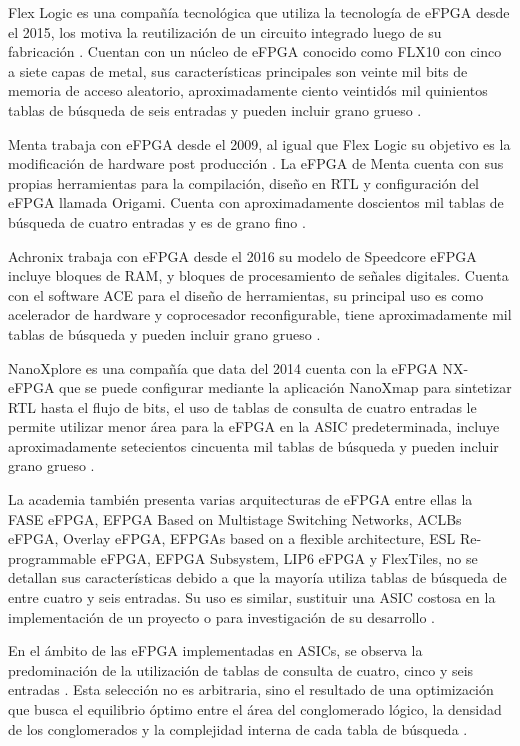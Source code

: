 Flex Logic es una compañía tecnológica que utiliza la tecnología de eFPGA desde el 2015, los motiva la reutilización de un circuito integrado luego de su fabricación \cite{saidi2020survey}. Cuentan con un núcleo de eFPGA conocido como FLX10 con cinco a siete capas de metal, sus características principales son veinte mil bits de memoria de acceso aleatorio, aproximadamente ciento veintidós mil quinientos tablas de búsqueda de seis entradas y pueden incluir grano grueso \cite{saidi2020survey}.

Menta trabaja con eFPGA desde el 2009, al igual que Flex Logic su objetivo es la modificación de hardware post producción \cite{saidi2020survey, abderrahmaneMaximizeFlexibility}. La eFPGA de Menta cuenta con sus propias herramientas para la compilación, diseño en RTL y configuración del eFPGA llamada Origami. Cuenta con aproximadamente doscientos mil tablas de búsqueda de cuatro entradas y es de grano fino \cite{saidi2020survey, abderrahmaneMaximizeFlexibility}.

Achronix trabaja con eFPGA desde el 2016 su modelo de Speedcore eFPGA incluye bloques de RAM, y bloques de procesamiento de señales digitales. Cuenta con el software ACE para el diseño de herramientas, su principal uso es como acelerador de hardware y coprocesador reconfigurable, tiene aproximadamente mil tablas de búsqueda y pueden incluir grano grueso \cite{abderrahmaneMaximizeFlexibility}.

NanoXplore es una compañía que data del 2014 cuenta con la eFPGA NX-eFPGA que se puede configurar mediante la aplicación NanoXmap para sintetizar RTL hasta el flujo de bits, el uso de tablas de consulta de cuatro entradas le permite utilizar menor área para la eFPGA en la ASIC predeterminada, incluye aproximadamente setecientos cincuenta mil tablas de búsqueda y pueden incluir grano grueso \cite{abderrahmaneMaximizeFlexibility}.

La academia también presenta varias arquitecturas de eFPGA entre ellas la FASE eFPGA, EFPGA Based on Multistage Switching Networks, ACLBs eFPGA, Overlay eFPGA, EFPGAs based on a flexible architecture, ESL Re-programmable eFPGA, EFPGA Subsystem, LIP6 eFPGA y FlexTiles, no se detallan sus características debido a que la mayoría utiliza tablas de búsqueda de entre cuatro y seis entradas. Su uso es similar, sustituir una ASIC costosa en la implementación de un proyecto o para investigación de su desarrollo \cite{saidi2020survey, abderrahmaneMaximizeFlexibility}.

En el ámbito de las eFPGA implementadas en ASICs, se observa la predominación de la utilización de tablas de consulta de cuatro, cinco y seis entradas \cite{saidi2020survey, abderrahmaneMaximizeFlexibility}. Esta selección no es arbitraria, sino el resultado de una optimización que busca el equilibrio óptimo entre el área del conglomerado lógico, la densidad de los conglomerados y la complejidad interna de cada tabla de búsqueda \cite{saidi2020survey, abderrahmaneMaximizeFlexibility}.

